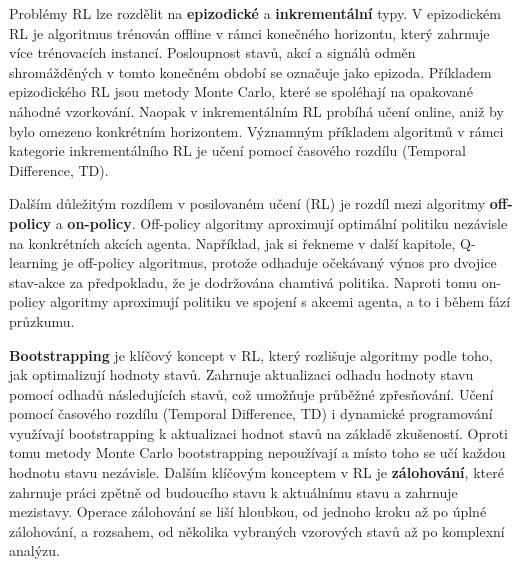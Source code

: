 Problémy RL lze rozdělit na \textbf{epizodické} a \textbf{inkrementální} typy. V epizodickém RL je algoritmus trénován offline v rámci konečného horizontu, který zahrnuje více trénovacích instancí. Posloupnost stavů, akcí a signálů odměn shromážděných v tomto konečném období se označuje jako epizoda. Příkladem epizodického RL jsou metody Monte Carlo, které se spoléhají na opakované náhodné vzorkování. Naopak v inkrementálním RL probíhá učení online, aniž by bylo omezeno konkrétním horizontem. Významným příkladem algoritmů v rámci kategorie inkrementálního RL je učení pomocí časového rozdílu (Temporal Difference, TD).

\newpage

Dalším důležitým rozdílem v posilovaném učení (RL) je rozdíl mezi algoritmy \textbf{off-policy} a \textbf{on-policy}. Off-policy algoritmy aproximují optimální politiku nezávisle na konkrétních akcích agenta. Například, jak si řekneme v další kapitole, Q-learning je off-policy algoritmus, protože odhaduje očekávaný výnos pro dvojice stav-akce za předpokladu, že je dodržována chamtivá politika. Naproti tomu on-policy algoritmy aproximují politiku ve spojení s akcemi agenta, a to i během fází průzkumu.

\textbf{Bootstrapping} je klíčový koncept v RL, který rozlišuje algoritmy podle toho, jak optimalizují hodnoty stavů. Zahrnuje aktualizaci odhadu hodnoty stavu pomocí odhadů následujících stavů, což umožňuje průběžné zpřesňování. Učení pomocí časového rozdílu (Temporal Difference, TD) i dynamické programování využívají bootstrapping k aktualizaci hodnot stavů na základě zkušeností. Oproti tomu metody Monte Carlo bootstrapping nepoužívají a místo toho se učí každou hodnotu stavu nezávisle. Dalším klíčovým konceptem v RL je \textbf{zálohování}, které zahrnuje práci zpětně od budoucího stavu k aktuálnímu stavu a zahrnuje mezistavy. Operace zálohování se liší hloubkou, od jednoho kroku až po úplné zálohování, a rozsahem, od několika vybraných vzorových stavů až po komplexní analýzu.

